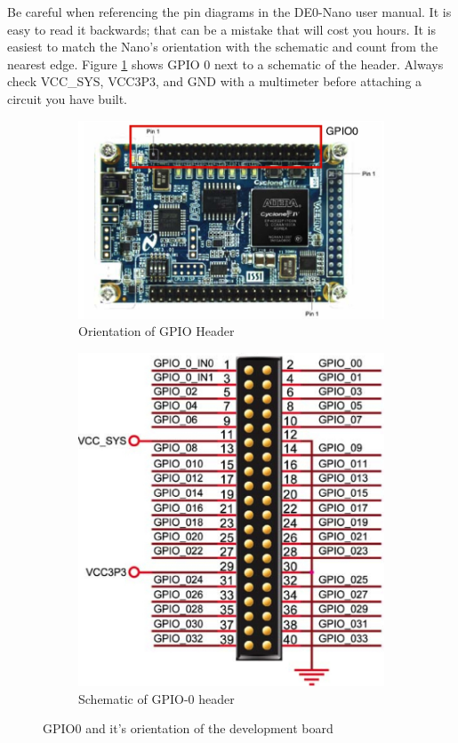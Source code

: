         Be careful when referencing the pin diagrams in the DE0-Nano user manual. It is easy to read it backwards; that can be a mistake that will cost you hours. It is easiest to match the Nano's orientation with the schematic and count from the nearest edge. Figure \ref{pinmap} shows GPIO 0 next to a schematic of the header. Always check VCC\_SYS, VCC3P3, and GND with a multimeter before attaching a circuit you have built.        \begin{figure}
          \centering
          \begin{subfigure}[b]{.38\textwidth}
            \includegraphics[angle=270, width=.9\textwidth]{Images/LabeledGPIOHeaders.jpg}
            \caption{Orientation of GPIO Header\cite{DE0Manual}}
          \end{subfigure}
          \begin{subfigure}[b]{.45\textwidth}
            \includegraphics[width=\textwidth]{Images/GPIOHeader.jpg}
            \caption{Schematic of GPIO-0 header\cite{DE0Manual}}
          \end{subfigure}
          \caption{GPIO0 and it's orientation of the development board}
          \label{pinmap}
        \end{figure}
